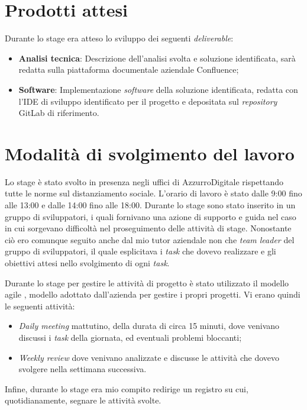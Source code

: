 \section{Prodotti attesi}
\label{cap:prodotti}
Durante lo stage era atteso lo sviluppo dei seguenti \emph{deliverable}:
\begin{itemize}
	\item \textbf{Analisi tecnica}: Descrizione dell’analisi svolta e soluzione identificata, sarà redatta sulla piattaforma documentale aziendale Confluence;
	\item \textbf{Software}: Implementazione \emph{software} della soluzione identificata, redatta con l’IDE di sviluppo identificato per il progetto e depositata sul \emph{repository} GitLab di riferimento.
\end{itemize}

\section{Modalità di svolgimento del lavoro}
Lo stage è stato svolto in presenza negli uffici di AzzurroDigitale rispettando tutte le norme sul distanziamento sociale. L'orario di lavoro è stato dalle 9:00 fino alle 13:00 e dalle 14:00 fino alle 18:00. Durante lo stage sono stato inserito in un gruppo di sviluppatori, i quali fornivano una azione di supporto e guida nel caso in cui sorgevano difficoltà nel proseguimento delle attività di stage. Nonostante ciò ero comunque seguito anche dal mio tutor aziendale non che \emph{team leader} del gruppo di sviluppatori, il quale esplicitava i \emph{task} che dovevo realizzare e gli obiettivi attesi nello svolgimento di ogni \emph{task}. 

Durante lo stage per gestire le attività di progetto è stato utilizzato il modello agile , modello adottato dall'azienda per gestire i propri progetti.
Vi erano quindi le seguenti attività:
\begin{itemize}
	\item \emph{Daily meeting} mattutino, della durata di circa 15 minuti, dove venivano discussi i \emph{task} della giornata, ed eventuali problemi bloccanti;
	\item \emph{Weekly review} dove venivano analizzate e discusse le attività che dovevo svolgere nella settimana successiva.
\end{itemize}

Infine, durante lo stage era mio compito redirige un registro su cui, quotidianamente, segnare le attività svolte.

